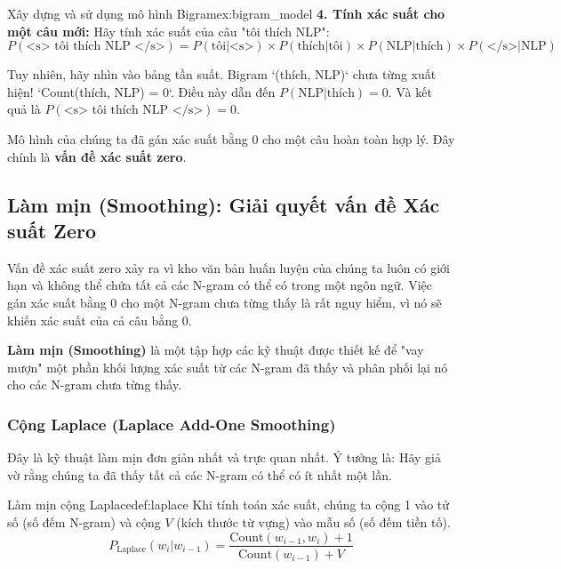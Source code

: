 \begin{example}{Xây dựng và sử dụng mô hình Bigram}{ex:bigram_model}
    \textbf{4. Tính xác suất cho một câu mới:}
    Hãy tính xác suất của câu "tôi thích NLP":
    $P(\text{<s> tôi thích NLP </s>}) = P(\text{tôi}|\text{<s>}) \times P(\text{thích}|\text{tôi}) \times P(\text{NLP}|\text{thích}) \times P(\text{</s>}|\text{NLP})$

    Tuy nhiên, hãy nhìn vào bảng tần suất. Bigram `(thích, NLP)` chưa từng xuất hiện! `Count(thích, NLP) = 0`.
    Điều này dẫn đến $P(\text{NLP}|\text{thích}) = 0$.
    Và kết quả là $P(\text{<s> tôi thích NLP </s>}) = 0$.

    Mô hình của chúng ta đã gán xác suất bằng 0 cho một câu hoàn toàn hợp lý. Đây chính là \textbf{vấn đề xác suất zero}.
\end{example}

\subsection{Làm mịn (Smoothing): Giải quyết vấn đề Xác suất Zero}
\label{ssec:smoothing}

Vấn đề xác suất zero xảy ra vì kho văn bản huấn luyện của chúng ta luôn có giới hạn và không thể chứa tất cả các N-gram có thể có trong một ngôn ngữ. Việc gán xác suất bằng 0 cho một N-gram chưa từng thấy là rất nguy hiểm, vì nó sẽ khiến xác suất của cả câu bằng 0.

\textbf{Làm mịn (Smoothing)} là một tập hợp các kỹ thuật được thiết kế để "vay mượn" một phần khối lượng xác suất từ các N-gram đã thấy và phân phối lại nó cho các N-gram chưa từng thấy.

\subsubsection{Cộng Laplace (Laplace Add-One Smoothing)}
Đây là kỹ thuật làm mịn đơn giản nhất và trực quan nhất. Ý tưởng là: Hãy giả vờ rằng chúng ta đã thấy tất cả các N-gram có thể có ít nhất một lần.

\begin{definition}{Làm mịn cộng Laplace}{def:laplace}
    Khi tính toán xác suất, chúng ta cộng 1 vào tử số (số đếm N-gram) và cộng $V$ (kích thước từ vựng) vào mẫu số (số đếm tiền tố).
    $$ P_{\text{Laplace}}(w_i | w_{i-1}) = \frac{\text{Count}(w_{i-1}, w_i) + 1}{\text{Count}(w_{i-1}) + V} $$
\end{definition}

